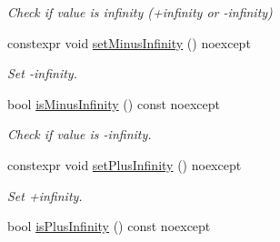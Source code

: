 \begin{DoxyCompactItemize}
\begin{DoxyCompactList}\small\item\em Check if value is infinity (+infinity or -\/infinity) \end{DoxyCompactList}\item 
constexpr void \hyperlink{class_mdt_1_1_numeric_1_1_double_aad324b42829414e760ca305f70a0a692}{set\+Minus\+Infinity} () noexcept\hypertarget{class_mdt_1_1_numeric_1_1_double_aad324b42829414e760ca305f70a0a692}{}\label{class_mdt_1_1_numeric_1_1_double_aad324b42829414e760ca305f70a0a692}

\begin{DoxyCompactList}\small\item\em Set -\/infinity. \end{DoxyCompactList}\item 
bool \hyperlink{class_mdt_1_1_numeric_1_1_double_a08fc926a071bfcda66e86b0081825b44}{is\+Minus\+Infinity} () const noexcept\hypertarget{class_mdt_1_1_numeric_1_1_double_a08fc926a071bfcda66e86b0081825b44}{}\label{class_mdt_1_1_numeric_1_1_double_a08fc926a071bfcda66e86b0081825b44}

\begin{DoxyCompactList}\small\item\em Check if value is -\/infinity. \end{DoxyCompactList}\item 
constexpr void \hyperlink{class_mdt_1_1_numeric_1_1_double_a922f39ec2ee308c7c86471252a22a28c}{set\+Plus\+Infinity} () noexcept\hypertarget{class_mdt_1_1_numeric_1_1_double_a922f39ec2ee308c7c86471252a22a28c}{}\label{class_mdt_1_1_numeric_1_1_double_a922f39ec2ee308c7c86471252a22a28c}

\begin{DoxyCompactList}\small\item\em Set +infinity. \end{DoxyCompactList}\item 
bool \hyperlink{class_mdt_1_1_numeric_1_1_double_aff0038f2052e0942cd7544097ccbe40a}{is\+Plus\+Infinity} () const noexcept\hypertarget{class_mdt_1_1_numeric_1_1_double_aff0038f2052e0942cd7544097ccbe40a}{}\label{class_mdt_1_1_numeric_1_1_double_aff0038f2052e0942cd7544097ccbe40a}


\end{DoxyCompactItemize}
